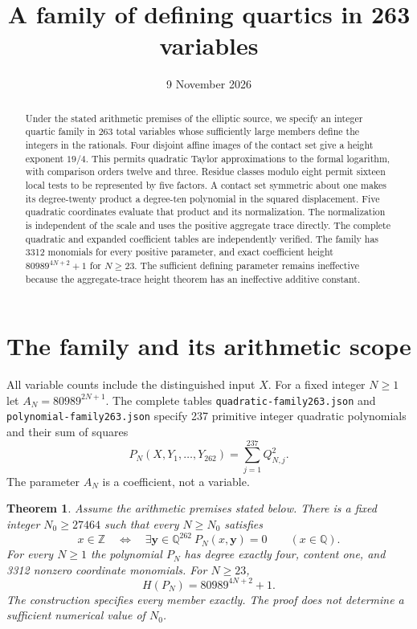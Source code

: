 \documentclass[11pt,a4paper]{article}
\title{A family of defining quartics in 263 variables}
\author{}\date{9 November 2026}
\newtheorem{theorem}{Theorem}[section]\newtheorem{lemma}[theorem]{Lemma}
\newcommand{\Q}{\mathbb Q}\newcommand{\Z}{\mathbb Z}\newcommand{\HH}{\mathcal H}
\begin{document}
\maketitle
\begin{abstract}
Under the stated arithmetic premises of the elliptic source, we specify
an integer quartic family in 263 total variables whose sufficiently
large members define the integers in the rationals. Four disjoint
affine images of the contact set give a height exponent $19/4$. This permits
quadratic Taylor approximations to the formal logarithm, with comparison
orders twelve and three. Residue classes modulo eight permit sixteen local tests to be represented
by five factors. A contact set symmetric about one makes its degree-twenty product
a degree-ten polynomial in the squared displacement. Five quadratic
coordinates evaluate that product and its normalization. The normalization
is independent of the scale and uses the positive aggregate trace directly. The complete
quadratic and expanded coefficient tables are independently verified.
The family has 3312 monomials for every positive parameter, and exact
coefficient height $80989^{4N+2}+1$ for $N\ge23$. The sufficient defining
parameter remains ineffective because the aggregate-trace height theorem
has an ineffective additive constant.
\end{abstract}

\section{The family and its arithmetic scope}
All variable counts include the distinguished input $X$. For a fixed
integer $N\ge1$ let $A_N=80989^{2N+1}$. The complete tables
\nolinkurl{quadratic-family263.json} and
\nolinkurl{polynomial-family263.json} specify 237 primitive integer
quadratic polynomials and their sum of squares
\[
 P_N(X,Y_1,\ldots,Y_{262})=\sum_{j=1}^{237}Q_{N,j}^2.
\]
The parameter $A_N$ is a coefficient, not a variable.

\begin{theorem}\label{thm:main}
Assume the arithmetic premises stated below. There is a fixed integer
$N_0\ge27464$ such that every $N\ge N_0$ satisfies
\[
 x\in\Z\quad\Longleftrightarrow\quad
 \exists\mathbf y\in\Q^{262}\ P_N(x,\mathbf y)=0
 \qquad(x\in\Q).
\]
For every $N\ge1$ the polynomial $P_N$ has degree exactly four,
content one, and 3312 nonzero coordinate monomials. For $N\ge23$,
\[
                       H(P_N)=80989^{4N+2}+1.
\]
The construction specifies every member exactly. The proof does not
determine a sufficient numerical value of $N_0$.
\end{theorem}
\end{document}
